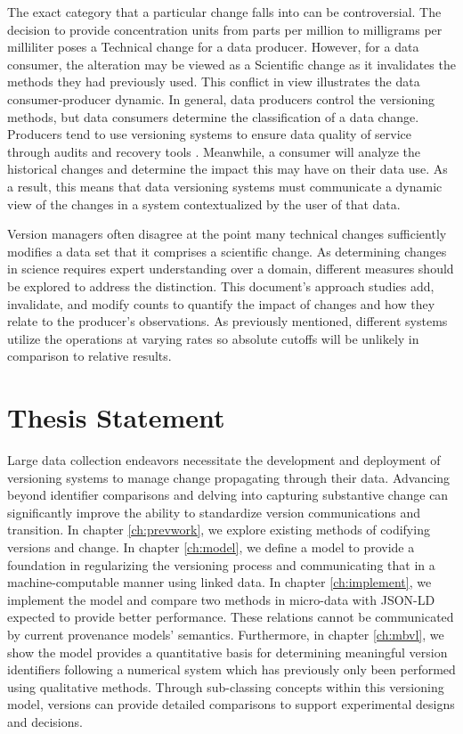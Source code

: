 The exact category that a particular change falls into can be controversial.
The decision to provide concentration units from parts per million to milligrams per milliliter poses a Technical change for a data producer.
However, for a data consumer, the alteration may be viewed as a Scientific change as it invalidates the methods they had previously used.
This conflict in view illustrates the data consumer-producer dynamic.
In general, data producers control the versioning methods, but data consumers determine the classification of a data change.
Producers tend to use versioning systems to ensure data quality of service through audits and recovery tools \cite{Cavanaugh2002}.
Meanwhile, a consumer will analyze the historical changes and determine the impact this may have on their data use.
As a result, this means that data versioning systems must communicate a dynamic view of the changes in a system contextualized by the user of that data.

Version managers often disagree at the point many technical changes sufficiently modifies a data set that it comprises a scientific change.
As determining changes in science requires expert understanding over a domain, different measures should be explored to address the distinction.
This document's approach studies add, invalidate, and modify counts to quantify the impact of changes and how they relate to the producer's observations.
As previously mentioned, different systems utilize the operations at varying rates so absolute cutoffs will be unlikely in comparison to relative results.

\section{Thesis Statement}

Large data collection endeavors necessitate the development and deployment of versioning systems to manage change propagating through their data.
Advancing beyond identifier comparisons and delving into capturing substantive change can significantly improve the ability to standardize version communications and transition.
In chapter \ref{ch:prevwork}, we explore existing methods of codifying versions and change.
In chapter \ref{ch:model}, we define a model to provide a foundation in regularizing the versioning process and communicating that in a machine-computable manner using linked data.
In chapter \ref{ch:implement}, we implement the model and compare two methods in micro-data with JSON-LD expected to provide better performance.
These relations cannot be communicated by current provenance models' semantics.
Furthermore, in chapter \ref{ch:mbvl}, we show the model provides a quantitative basis for determining meaningful version identifiers following a numerical system which has previously only been performed using qualitative methods.
Through sub-classing concepts within this versioning model, versions can provide detailed comparisons to support experimental designs and decisions.


